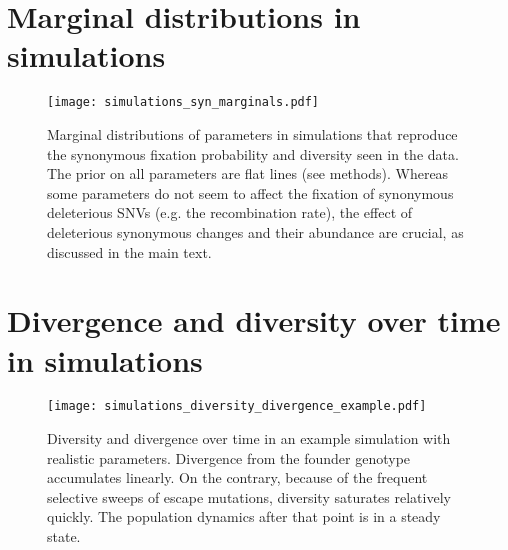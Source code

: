 \newpage
\section{Marginal distributions in simulations}
\begin{figure}[h]
\begin{center}
\texttt{[image: simulations\_syn\_marginals.pdf]}
\caption{
Marginal distributions of parameters in simulations that reproduce the
synonymous fixation probability and diversity seen in the data. The prior on all
parameters are flat lines (see methods). Whereas some parameters do not seem to
affect the fixation of synonymous deleterious SNVs (e.g. the recombination
rate), the effect of deleterious synonymous changes and their abundance are
crucial, as discussed in the main text.
}
\label{fig:sims_altparameters}
\end{center}
\end{figure}


\newpage
\section{Divergence and diversity over time in simulations}
\begin{figure}[h]
\begin{center}
\texttt{[image: simulations\_diversity\_divergence\_example.pdf]}
\caption{
Diversity and divergence over time in an example simulation with realistic
parameters. Divergence from the founder genotype accumulates linearly. On the
contrary, because of the frequent selective sweeps of escape mutations, diversity saturates
relatively quickly. The population dynamics after that point is in a steady
state.
}
\label{fig:sims_altparameters}
\end{center}
\end{figure}

